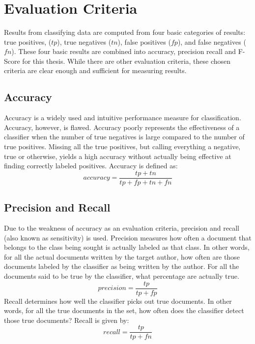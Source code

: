 \section {Evaluation Criteria}
	\paragraph{}Results from classifying data are computed from four basic categories of results: true positives, ($tp$), true negatives ($tn$), false positives ($fp$), and false negatives ($fn$).  These four basic results are combined into accuracy, precision recall and F-Score for this thesis.  While there are other evaluation criteria, these chosen criteria are clear enough and sufficient for measuring results.
	
	\subsection {Accuracy} Accuracy is a widely used and intuitive performance measure for classification.  Accuracy, however, is flawed.  Accuracy poorly represents the effectiveness of a classifier when the number of true negatives is large compared to the number of true positives.  Missing all the true positives, but calling everything a negative, true or otherwise, yields a high accuracy without actually being effective at finding correctly labeled positives.  Accuracy is defined as:
	\begin{equation} accuracy = \frac{tp + tn}{tp + fp + tn + fn} \end{equation}\cite{sokolova_beyond_2006}

	\subsection {Precision and Recall} Due to the weakness of accuracy as an evaluation criteria, precision and recall (also known as sensitivity) is used.  Precision measures how often a document that belongs to the class being sought is actually labeled as that class.  In other words, for all the actual documents written by the target author, how often are those documents labeled by the classifier as being written by the author.  For all the documents said to be true by the classifier, what percentage are actually true.
	\begin{equation} precision = \frac{tp}{tp + fp} \end{equation} Recall determines how well the classifier picks out true documents.  In other words, for all the true documents in the set, how often does the classifier detect those true documents?  Recall is given by:
	\begin{equation} recall = \frac{tp}{tp + fn} \end{equation}\cite{sokolova_beyond_2006}


